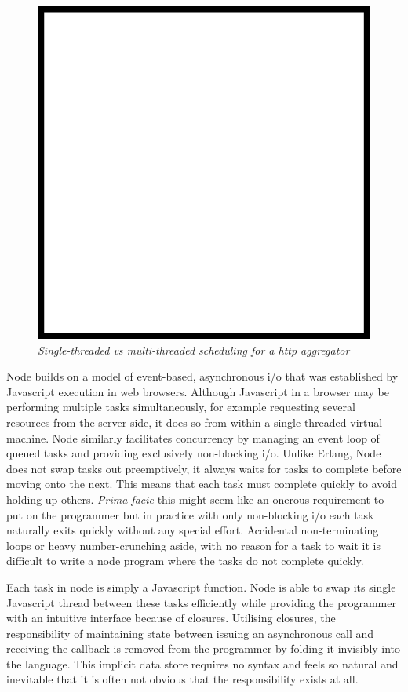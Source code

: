 \documentclass[]{article}
\makeatletter
\def\maxwidth{\ifdim\Gin@nat@width>\linewidth\linewidth
\else\Gin@nat@width\fi}
\let\Oldincludegraphics\includegraphics
\renewcommand{\includegraphics}[1]{\Oldincludegraphics[width=\maxwidth]{#1}}
\makeatother
\begin{document}
\begin{figure}[htbp]
\centering
\includegraphics{images/placeholder.png}
\caption{\emph{Single-threaded vs multi-threaded scheduling for a http
aggregator}}
\end{figure}

Node builds on a model of event-based, asynchronous i/o that was
established by Javascript execution in web browsers. Although Javascript
in a browser may be performing multiple tasks simultaneously, for
example requesting several resources from the server side, it does so
from within a single-threaded virtual machine. Node similarly
facilitates concurrency by managing an event loop of queued tasks and
providing exclusively non-blocking i/o. Unlike Erlang, Node does not
swap tasks out preemptively, it always waits for tasks to complete
before moving onto the next. This means that each task must complete
quickly to avoid holding up others. \emph{Prima facie} this might seem
like an onerous requirement to put on the programmer but in practice
with only non-blocking i/o each task naturally exits quickly without any
special effort. Accidental non-terminating loops or heavy
number-crunching aside, with no reason for a task to wait it is
difficult to write a node program where the tasks do not complete
quickly.

Each task in node is simply a Javascript function. Node is able to swap
its single Javascript thread between these tasks efficiently while
providing the programmer with an intuitive interface because of
closures. Utilising closures, the responsibility of maintaining state
between issuing an asynchronous call and receiving the callback is
removed from the programmer by folding it invisibly into the language.
This implicit data store requires no syntax and feels so natural and
inevitable that it is often not obvious that the responsibility exists
at all.
\end{document}
